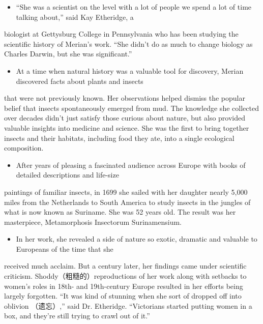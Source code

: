 \documentclass[UTF8,11pt]{ctexart}
\begin{document}
\begin{itemize}[leftmargin=2em,itemsep=.2em,topsep=.4em]\item[B.] “She was a scientist on the level with a lot of people we spend a lot of time talking about,” said Kay Etheridge, a
\end{itemize}

biologist at Gettysburg College in Pennsylvania who has been studying the scientific history of Merian’s work. “She didn't do as much to change biology as Charles Darwin, but she was significant.”


\begin{itemize}[leftmargin=2em,itemsep=.2em,topsep=.4em]\item[C.] At a time when natural history was a valuable tool for discovery, Merian discovered facts about plants and insects
\end{itemize}

that were not previously known. Her observations helped dismiss the popular belief that insects spontaneously emerged from mud. The knowledge she collected over decades didn't just satisfy those curious about nature, but also provided valuable insights into medicine and science. She was the first to bring together insects and their habitats, including food they ate, into a single ecological composition.


\begin{itemize}[leftmargin=2em,itemsep=.2em,topsep=.4em]\item[D.] After years of pleasing a fascinated audience across Europe with books of detailed descriptions and life-size
\end{itemize}

paintings of familiar insects, in 1699 she sailed with her daughter nearly 5,000 miles from the Netherlands to South America to study insects in the jungles of what is now known as Suriname. She was 52 years old. The result was her masterpiece, Metamorphosis Insectorum Surinamensium.


\begin{itemize}[leftmargin=2em,itemsep=.2em,topsep=.4em]\item[E.] In her work, she revealed a side of nature so exotic, dramatic and valuable to Europeans of the time that she
\end{itemize}

received much acclaim. But a century later, her findings came under scientific criticism. Shoddy（粗糙的）reproductions of her work along with setbacks to women's roles in 18th- and 19th-century Europe resulted in her efforts being largely forgotten. “It was kind of stunning when she sort of dropped off into oblivion （遗忘）,” said Dr. Etheridge. “Victorians started putting women in a box, and they're still trying to crawl out of it.”
\end{document}
